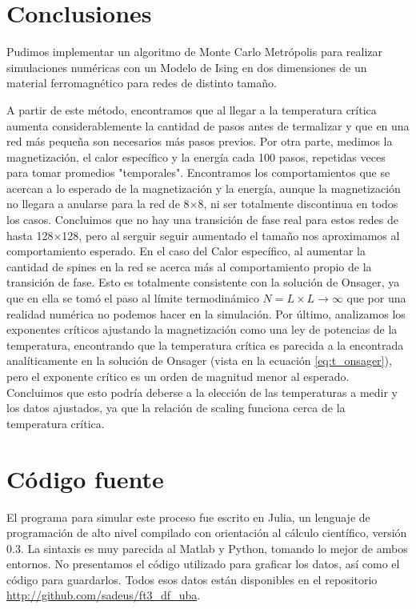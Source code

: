 \documentclass[12pt,a4paper]{article}
\begin{document}
\section{Conclusiones}
Pudimos implementar un algoritmo de Monte Carlo Metrópolis para realizar simulaciones numéricas con un Modelo de Ising en dos dimensiones de un material ferromagnético para redes de distinto tamaño.

A partir de este método, encontramos que al llegar a la temperatura crítica aumenta considerablemente la cantidad de pasos antes de termalizar y que en una red más pequeña son necesarios más pasos previos.
Por otra parte, medimos la magnetización, el calor específico y la energía cada 100 pasos, repetidas veces para tomar promedios "temporales". Encontramos los comportamientos que se acercan a lo esperado de la magnetización y la energía, aunque la magnetización no llegara a anularse para la red de 8$\times$8, ni ser totalmente discontinua en todos los casos. Concluimos que no hay una transición de fase real para estos redes de hasta 128$\times$128, pero al serguir seguir aumentado el tamaño nos aproximamos al comportamiento esperado.
En el caso del Calor específico, al aumentar la cantidad de spines en la red se acerca más al comportamiento propio de la transición de fase. Esto es totalmente consistente con la solución de Onsager, ya que en ella se tomó el paso al límite termodinámico $N = L \times L \to \infty$ que por una realidad numérica no podemos hacer en la simulación.
Por último, analizamos los exponentes críticos ajustando la magnetización como una ley de potencias de la temperatura, encontrando que la temperatura crítica es parecida a la encontrada analíticamente en la solución de Onsager (vista en la ecuación \ref{eq:t_onsager}), pero el exponente crítico es un orden de magnitud menor al esperado. Concluimos que esto podría deberse a la elección de las temperaturas a medir y los datos ajustados, ya que la relación de scaling funciona cerca de la temperatura crítica.


\clearpage %
\addappheadtotoc

\appendixpage

\appendix

\section{Código fuente}

El programa para simular este proceso fue escrito en Julia, un lenguaje de programación de alto nivel compilado con orientación al cálculo científico, versión 0.3. La sintaxis es muy parecida al Matlab y Python, tomando lo mejor de ambos entornos.
No presentamos el código utilizado para graficar los datos, así como el código para guardarlos. Todos esos datos están disponibles en el repositorio \url{http://github.com/sadeus/ft3_df_uba}.


\end{document}
